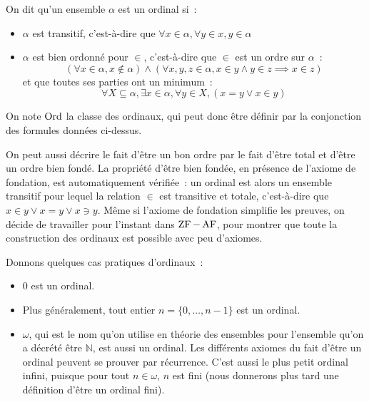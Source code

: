 \begin{definition}[Ordinal]
  On dit qu'un ensemble $\alpha$ est un ordinal si~:
  \begin{itemize}
  \item $\alpha$ est transitif, c'est-à-dire que
    $\forall x\in \alpha, \forall y \in x, y\in \alpha$
  \item $\alpha$ est bien ordonné pour $\in$, c'est-à-dire que $\in$ est un
    ordre sur $\alpha$~:
    \[(\forall x\in \alpha, x\notin \alpha)\land (\forall x,y,z\in \alpha,
    x\in y \land y \in z \implies x \in z)\]
    et que toutes ses parties ont un minimum~:
    \[\forall X\subseteq \alpha, \exists x \in \alpha, \forall y \in X,
    (x=y \lor x \in y)\]
  \end{itemize}

  On note $\operatorname{Ord}$ la classe des ordinaux, qui peut donc être définir par la
  conjonction des formules données ci-dessus.
\end{definition}

\begin{remark}
  On peut aussi décrire le fait d'être un bon ordre par le fait d'être total
  et d'être un ordre bien fondé. La propriété d'être bien fondée, en présence
  de l'axiome de fondation, est automatiquement vérifiée~: un ordinal est alors
  un ensemble transitif pour lequel la relation $\in$ est transitive et totale,
  c'est-à-dire que $x\in y \lor x = y \lor x\ni y$. Même si l'axiome de
  fondation simplifie les preuves, on décide de travailler pour l'instant dans
  $\operatorname{ZF} - \operatorname{AF}$, pour montrer que toute la construction des ordinaux est possible
  avec peu d'axiomes.
\end{remark}

\begin{example}
  Donnons quelques cas pratiques d'ordinaux~:
  \begin{itemize}
  \item $0$ est un ordinal.
  \item Plus généralement, tout entier $n = \{0,\ldots,n-1\}$ est un ordinal.
  \item $\omega$, qui est le nom qu'on utilise en théorie des ensembles pour
    l'ensemble qu'on a décrété être $\mathbb N$, est aussi un ordinal. Les
    différents axiomes du fait d'être un ordinal peuvent se prouver par
    récurrence. C'est aussi le plus petit ordinal infini, puisque pour tout
    $n\in \omega$, $n$ est fini (nous donnerons plus tard une définition d'être
    un ordinal fini).
  \end{itemize}
\end{example}

